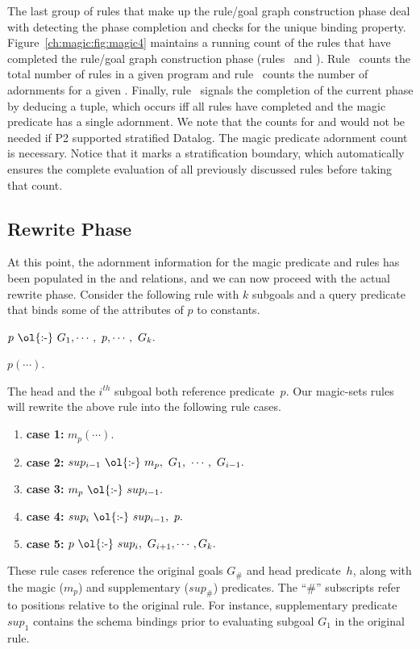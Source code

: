 The last group of rules that make up the rule/goal graph construction phase
deal with detecting the phase completion and checks for the unique binding
property.  Figure~\ref{ch:magic:fig:magic4} maintains a running count of the
rules that have completed the rule/goal graph construction phase
(rules~ and ).  Rule~ counts the total number of rules
in a given program and rule~ counts the number of adornments for a
given .  Finally, rule~ signals the completion of the
current phase by deducing a  tuple, which occurs iff all
rules have completed and the magic predicate has a single adornment.  We note
that the counts for  and  would not be
needed if P2 supported stratified Datalog.  The magic predicate adornment count
is necessary.  Notice that it marks a stratification boundary, which
automatically ensures the complete evaluation of all previously discussed rules
before taking that count.


\subsection{Rewrite Phase}
\label{ch:magic:sec:rewrite}
 
At this point, the adornment information for the magic predicate and rules has
been populated in the  and  relations, and we can now
proceed with the actual rewrite phase.  Consider the following rule with
$k$ subgoals and a query predicate that binds some of the attributes of $p$ to
constants.
\begin{trivlist}
\ssp
\item $p\ \text{\ol{:-}}\ G_1, \cdots,\ p, \cdots,\ G_k.$
\item $p(\cdots).$
\end{trivlist}
The head and the $i^{th}$ subgoal both reference predicate~$p$.  Our magic-sets
rules will rewrite the above rule into the following rule cases.
\begin{enumerate}
\ssp
\item {\bf case 1:} $m_p(\cdots).$ 
\item {\bf case 2:} $sup_{i-1}\ \text{\ol{:-}}\ m_p,\ G_1,\ \cdots,\ G_{i-1}.$ 
\item {\bf case 3:} $m_p\ \text{\ol{:-}}\ sup_{i-1}.$ 
\item {\bf case 4:} $sup_i\ \text{\ol{:-}}\ sup_{i-1},\ p.$ 
\item {\bf case 5:} $p\ \text{\ol{:-}}\ sup_i,\ G_{i+1}, \cdots, G_k.$ 
\end{enumerate}
These rule cases reference the original goals $G_{\#}$ and head predicate~$h$,
along with the magic ($m_p$) and supplementary ($sup_{\#}$) predicates.  The
``\#'' subscripts refer to positions relative to the original rule.  For
instance, supplementary predicate $sup_1$ contains the schema bindings prior to
evaluating subgoal $G_1$ in the original rule.

